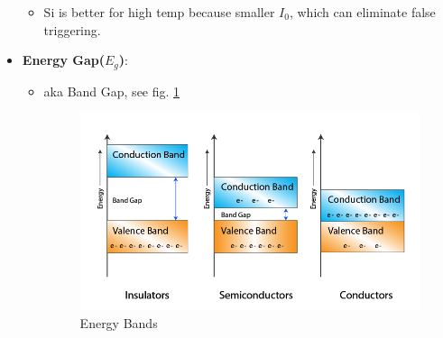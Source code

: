 \documentclass[10pt, a4paper]{report}
\begin{document}
\begin{itemize}
\begin{itemize}
			\item Si is better for high temp because smaller $ I_0 $, which can eliminate false triggering.
		\end{itemize}
		\item \textbf{Energy Gap($ E_g $)}:\begin{itemize}
			\item aka Band Gap, see fig. \ref{fig:energy-band-diagram}
			\begin{figure}
				\centering
				\includegraphics[width=0.7\linewidth]{img/Energy-band-diagram}
				\caption[Energy Bands]{Energy Bands}
				\label{fig:energy-band-diagram}
			\end{figure}
			

\end{itemize}
\end{itemize}
\end{document}
